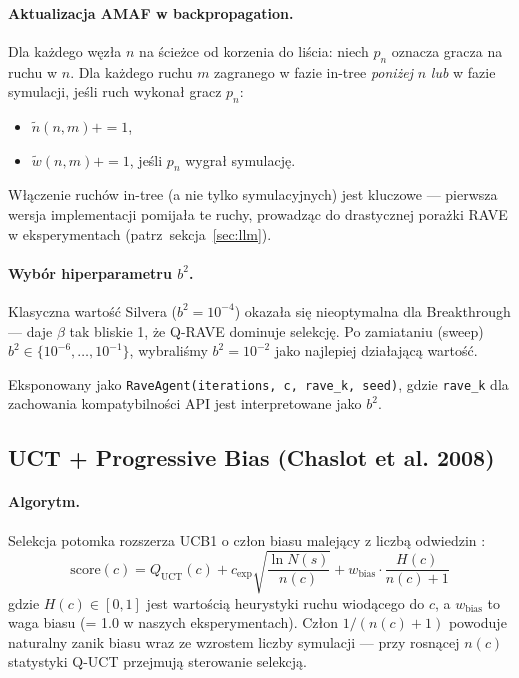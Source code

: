 \paragraph{Aktualizacja AMAF w backpropagation.}
Dla każdego węzła $n$ na ścieżce od korzenia do liścia: niech $p_n$ oznacza
gracza na ruchu w $n$. Dla każdego ruchu $m$ zagranego w fazie in-tree
\emph{poniżej} $n$ \emph{lub} w fazie symulacji, jeśli ruch wykonał gracz
$p_n$:
\begin{itemize}[nosep]
    \item $\tilde{n}(n, m) \mathrel{{+}{=}} 1$,
    \item $\tilde{w}(n, m) \mathrel{{+}{=}} 1$, jeśli $p_n$ wygrał symulację.
\end{itemize}

Włączenie ruchów in-tree (a nie tylko symulacyjnych) jest kluczowe ---
pierwsza wersja implementacji pomijała te ruchy, prowadząc do drastycznej
porażki RAVE w eksperymentach (patrz~sekcja~\ref{sec:llm}).

\paragraph{Wybór hiperparametru $b^2$.}
Klasyczna wartość Silvera ($b^2 = 10^{-4}$) okazała się nieoptymalna
dla Breakthrough --- daje $\beta$ tak bliskie 1, że Q-RAVE dominuje selekcję.
Po zamiataniu (sweep) $b^2 \in \{10^{-6}, \ldots, 10^{-1}\}$, wybraliśmy
$b^2 = 10^{-2}$ jako najlepiej działającą wartość.

Eksponowany jako \texttt{RaveAgent(iterations, c, rave\_k, seed)},
gdzie \texttt{rave\_k} dla zachowania kompatybilności API jest interpretowane
jako $b^2$.

\subsection{UCT + Progressive Bias (Chaslot et al. 2008)}

\paragraph{Algorytm.}
Selekcja potomka rozszerza UCB1 o człon biasu malejący z liczbą odwiedzin
\cite{chaslot2008progressive}:
\begin{equation}
    \text{score}(c) = Q_{\text{UCT}}(c) + c_{\text{exp}} \sqrt{\frac{\ln N(s)}{n(c)}} + w_{\text{bias}} \cdot \frac{H(c)}{n(c) + 1}
\end{equation}
gdzie $H(c) \in [0, 1]$ jest wartością heurystyki ruchu wiodącego do $c$,
a $w_{\text{bias}}$ to waga biasu (= 1.0 w naszych eksperymentach).
Człon $1/(n(c)+1)$ powoduje naturalny zanik biasu wraz ze wzrostem
liczby symulacji --- przy rosnącej $n(c)$ statystyki Q-UCT przejmują
sterowanie selekcją.

